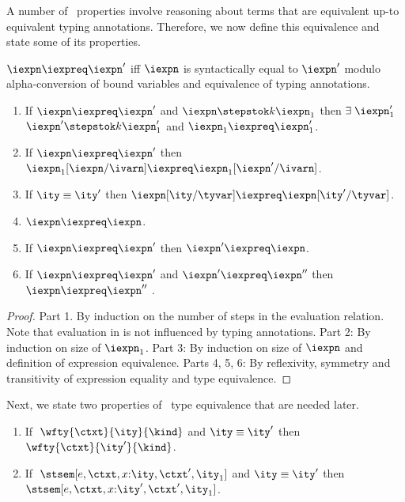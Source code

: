 A number of \ddc\ properties
involve reasoning about terms that are equivalent up-to equivalent
typing annotations. Therefore, we now define this equivalence and state
some of its properties.

\begin{definition}
  $\iexpn \iexpreq \iexpn'$ iff $\iexpn$ is syntactically equal to
  $\iexpn'$ modulo alpha-conversion of bound variables and equivalence
  of typing annotations.
\label{def:op-eq}  
\end{definition}

\begin{lemma}
  \begin{enumerate}
  \item If $\iexpn \iexpreq \iexpn'$ and $\iexpn \stepstok k \iexpn_1$ then
    $\exists\;\iexpn_1'$ \suchthat{}
    $\iexpn' \stepstok k \iexpn_1'$ and $\iexpn_1 \iexpreq \iexpn_1'$.
  \item If $\iexpn \iexpreq \iexpn'$ then 
    $\iexpn_1[\iexpn/\ivarn] \iexpreq \iexpn_1[\iexpn'/\ivarn]$.
  \item If $\ity \equiv \ity'$ then 
    $\iexpn[\ity/\tyvar] \iexpreq \iexpn[\ity'/\tyvar]$.
  \item $\iexpn \iexpreq \iexpn$.
  \item If $\iexpn \iexpreq \iexpn'$ then $\iexpn' \iexpreq \iexpn$. 
  \item If $\iexpn \iexpreq \iexpn'$ and $\iexpn' \iexpreq \iexpn''$  then
    $\iexpn \iexpreq \iexpn''$ .
  \end{enumerate}
\label{lemma:misc-synt-eq}
\end{lemma}

\begin{proof}
  Part 1. By induction on the number of steps in the evaluation relation.
  Note that evaluation in \fomega{} is not influenced by typing
  annotations. Part 2: By induction on size of $\iexpn_1$. Part 3: By
  induction on size of $\iexpn$ and definition of expression
  equivalence. Parts 4, 5, 6: By reflexivity, symmetry and transitivity
  of expression equality and type equivalence.
\end{proof}

Next, we state two properties of \fomega\ type equivalence that are
needed later.
\begin{lemma}
  \begin{enumerate}
  \item If $\;\wfty{\ctxt} {\ity} {\kind}$ and $\ity \equiv \ity'$ then
    $\wfty{\ctxt} {\ity'} {\kind}$. \label{lemma:fomega-eq-ty-kinding}
  \item If $\;\stsem[e,{\ctxt,x{:}\ity,\ctxt'},\ity_1]$ and $\ity \equiv
    \ity'$ then $\stsem[e,{\ctxt,x{:}\ity',\ctxt'},\ity_1]$. \label{lemma:fomega-eq-hyp-typing}
  \end{enumerate}
\label{lemma:fomega-ty-eq-props}
\end{lemma}

